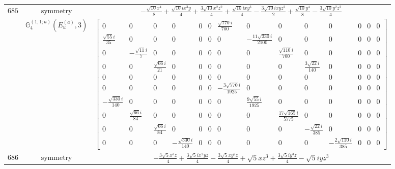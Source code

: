\documentclass[fleqn,8pt,landscape]{jsarticle}
\begin{document}
\begin{longtable}{ccc}
$ 685 $ & $ \text{symmetry} $ & $ - \frac{\sqrt{10} x^{4}}{8} + \frac{\sqrt{10} i x^{3} y}{4} + \frac{3 \sqrt{10} x^{2} z^{2}}{4} + \frac{\sqrt{10} i x y^{3}}{4} - \frac{3 \sqrt{10} i x y z^{2}}{2} + \frac{\sqrt{10} y^{4}}{8} - \frac{3 \sqrt{10} y^{2} z^{2}}{4} $ \\
$  $ & $ \mathbb{G}_{4}^{(1,1;a)}(E_{u}^{(a)},3) $ & $ \begin{bmatrix} 0 & 0 & 0 & 0 & 0 & 0 & \frac{\sqrt{770} i}{700} & 0 & 0 & 0 & 0 & 0 & 0 & 0 \\ \frac{\sqrt{55} i}{35} & 0 & 0 & 0 & 0 & 0 & 0 & - \frac{11 \sqrt{330} i}{2100} & 0 & 0 & 0 & 0 & 0 & 0 \\ 0 & - \frac{\sqrt{11} i}{7} & 0 & 0 & 0 & 0 & 0 & 0 & \frac{\sqrt{110} i}{700} & 0 & 0 & 0 & 0 & 0 \\ 0 & 0 & \frac{\sqrt{66} i}{21} & 0 & 0 & 0 & 0 & 0 & 0 & \frac{3 \sqrt{22} i}{140} & 0 & 0 & 0 & 0 \\ 0 & 0 & 0 & 0 & 0 & 0 & 0 & 0 & 0 & 0 & 0 & 0 & 0 & 0 \\ 0 & 0 & 0 & 0 & 0 & 0 & - \frac{3 \sqrt{770} i}{1925} & 0 & 0 & 0 & 0 & 0 & 0 & 0 \\ - \frac{\sqrt{330} i}{140} & 0 & 0 & 0 & 0 & 0 & 0 & \frac{9 \sqrt{55} i}{1925} & 0 & 0 & 0 & 0 & 0 & 0 \\ 0 & \frac{\sqrt{66} i}{84} & 0 & 0 & 0 & 0 & 0 & 0 & \frac{17 \sqrt{165} i}{5775} & 0 & 0 & 0 & 0 & 0 \\ 0 & 0 & \frac{\sqrt{66} i}{84} & 0 & 0 & 0 & 0 & 0 & 0 & - \frac{\sqrt{22} i}{385} & 0 & 0 & 0 & 0 \\ 0 & 0 & 0 & - \frac{\sqrt{330} i}{140} & 0 & 0 & 0 & 0 & 0 & 0 & - \frac{2 \sqrt{110} i}{385} & 0 & 0 & 0 \end{bmatrix} $ \\ \hline
$ 686 $ & $ \text{symmetry} $ & $ - \frac{3 \sqrt{5} x^{3} z}{4} + \frac{3 \sqrt{5} i x^{2} y z}{4} - \frac{3 \sqrt{5} x y^{2} z}{4} + \sqrt{5} x z^{3} + \frac{3 \sqrt{5} i y^{3} z}{4} - \sqrt{5} i y z^{3} $ \\

\end{longtable}
\end{document}
